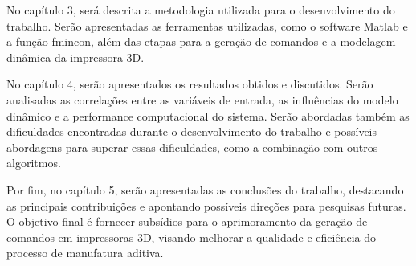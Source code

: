 No capítulo 3, será descrita a metodologia utilizada para o desenvolvimento do trabalho. Serão apresentadas as 
ferramentas utilizadas, como o software Matlab e a função fmincon, além das etapas para a geração de comandos 
e a modelagem dinâmica da impressora 3D.

No capítulo 4, serão apresentados os resultados obtidos e discutidos. Serão analisadas as correlações entre as 
variáveis de entrada, as influências do modelo dinâmico e a performance computacional do sistema. 
Serão abordadas também as dificuldades encontradas durante o desenvolvimento do trabalho e possíveis abordagens para superar essas dificuldades, como a combinação com outros algoritmos.

Por fim, no capítulo 5, serão apresentadas as conclusões do trabalho, destacando as principais contribuições e 
apontando possíveis direções para pesquisas futuras. O objetivo final é fornecer subsídios para o aprimoramento
da geração de comandos em impressoras 3D, visando melhorar a qualidade e eficiência do processo de manufatura aditiva.


